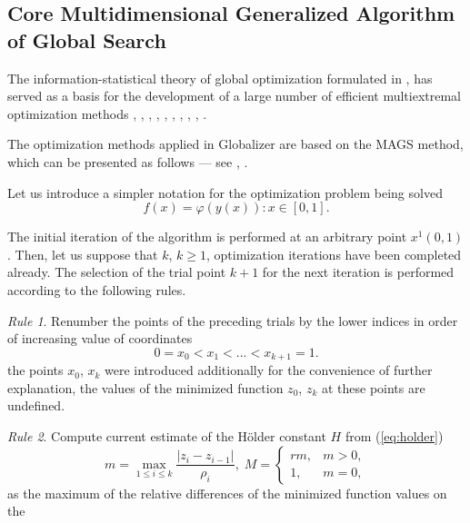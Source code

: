 \documentclass{aims}
\theoremstyle{definition}
\begin{document}
\subsection{Core Multidimensional Generalized Algorithm of Global Search}
\label{subsec:corepar}
The information-statistical theory of global optimization formulated in \cite{strongin1978}, \cite{strSergGO} has
served as a basis for the development of a large number of efficient multiextremal optimization
methods \cite{barkalovGergel2014}, \cite{Pizzuti}, \cite{gergel1996}, \cite{gergel1997}, \cite{grishaginStrongin1984}, \cite{sergeyev1995}, \cite{sergeyev1999}, \cite{sergeyevGrishagin2001}, \cite{sergeyevStronginLera2013}, \cite{Famularo2001}.
\par
The optimization methods applied in Globalizer are based on the MAGS method, which can be presented as follows --- see \cite{strongin1978}, \cite{strSergGO}.
\par
Let us introduce a simpler notation for the optimization problem being solved
\begin{equation}
\label{eq:oneDimFunc}
f(x) = \varphi(y(x)):x\in [0,1].
\end{equation}
\par
The initial iteration of the algorithm is performed at an arbitrary point \(x^1(0,1)\).
Then, let us suppose that \(k\), \(k\ge 1\), optimization iterations have been completed already.
The selection of the trial point \(k+1\) for the next iteration is performed according to the following rules.
\par
\textit{Rule 1}. Renumber the points of the preceding trials by the lower indices in order of increasing value of coordinates
\begin{equation}
  \label{step1}
0=x_0<x_1<...<x_{k+1}=1.
\end{equation}
the points \(x_0\), \(x_k\) were introduced additionally for the convenience of further
explanation, the values of the minimized function \(z_0\), \(z_k\) at these points are undefined.
\par
\textit{Rule 2}. Compute current estimate of the H{\"o}lder constant \(H\) from (\ref{eq:holder})
\begin{equation} \label{step2}
m=\max_{1\leq i\leq k}\frac{|z_i-z_{i-1}|}{\rho_i}, \;
M = \left\{
   \begin{array}{lr}
     rm, & m > 0,\\
     1, & m = 0,
   \end{array}
  \right.
\end{equation}
as the maximum of the relative differences of the minimized function values on the
\end{document}
